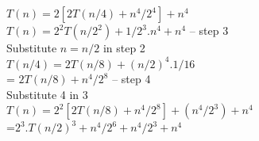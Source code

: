 \documentclass[11pt]{article}
\begin{document}
\begin{enumerate}
$T(n)=2[2T(n/4)+n^4/2^4] + n^4$ \\
$T(n) = 2^2 T(n/2^2) + 1/2^3.n^4+n^4$ -- step 3\\
Substitute  $n=n/2$ in step 2 \\
$T(n/4) = 2T(n/8)+(n/2)^4. 1/16$ \\
        = $2T(n/8) + n^4/2^8$  -- step 4\\

Substitute 4 in 3 \\

$T(n) = 2^2[2T(n/8) + n^4/2^8]+(n^4/2^3)+n^4$ \\
      =$2^3.T(n/2)^3+n^4/2^6+n^4/2^3+n^4 $\\
      















\end{enumerate}
\end{document}
